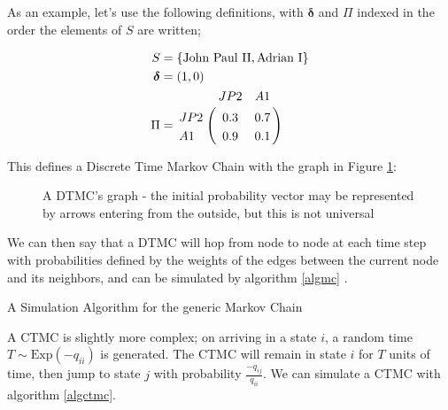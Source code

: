 As an example, let's use the following definitions, with $\bm{\delta}$ and $\Pi$ indexed in the order the elements of $S$ are written;

\begin{align*}
S &= \{\mbox{John Paul II}, \mbox{Adrian I}\}\\
\bm{\delta} &= \left(1,0\right)\\
\Pi &=
\bordermatrix{      & JP2&A1 \cr
                JP2 & 0.3 &  0.7 \cr
                A1  & 0.9 &  0.1 
			}
\end{align*}

This defines a Discrete Time Markov Chain with the graph in Figure \ref{popes}:

\begin{figure}[h]
\centering
{}
\caption{A DTMC's graph - the initial probability vector may be represented by arrows entering from the outside, but this is not universal}\label{popes}
\end{figure}

We can then say that a DTMC will hop from node to node at each time step with probabilities defined by the weights of the edges between the current node and its neighbors, and can be simulated by algorithm \ref{algmc} \cite[]{mc_simulation}.
\begin{algorithm}
\SetAlgoLined
{}

\caption{A Simulation Algorithm for the generic Markov Chain}\label{algmc}

\end{algorithm}
A CTMC is slightly more complex; on arriving in a state $i$, a random time $T \sim \mathrm{Exp}(-q_{ii})$ is generated. The CTMC will remain in state $i$ for $T$ units of time, then jump to state $j$ with probability $\frac{-q_{ij}}{q_{ii}}$. We can simulate a CTMC with algorithm \ref{algctmc}\cite[]{mc_simulation}.

